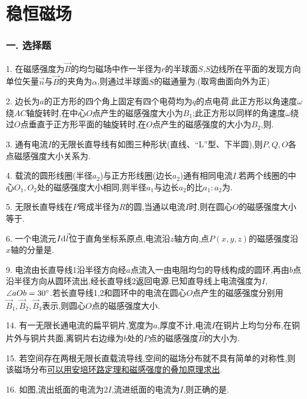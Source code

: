 \section*{稳恒磁场}

\subsubsection*{一. 选择题}

1. 在磁感强度为$\vec B$的均匀磁场中作一半径为$r$的半球面$S$,$S$边线所在平面的发现方向单位矢量$\vec n$与$\vec B$的夹角为$\alpha$,则通过半球面$S$的磁通量为.(取弯曲面向外为正)

2. 边长为$a$的正方形的四个角上固定有四个电荷均为$q$的点电荷.此正方形以角速度$\omega$绕$AC$轴旋转时,在中心$O$点产生的磁感强度大小为$B_1$;此正方形以同样的角速度$\omega$绕过$O$点垂直于正方形平面的轴旋转时,在$O$点产生的磁感强度的大小为$B_2$,则.

3. 通有电流$I$的无限长直导线有如图三种形状(直线、“L”型、下半圆),则$P,Q,O$各点磁感强度大小关系为.

4. 载流的圆形线圈(半径$a_2$)与正方形线圈(边长$a_2$)通有相同电流$I$.若两个线圈的中心$O_1,O_2$处的磁感强度大小相同,则半径$a_1$与边长$a_2$的比$a_1:a_2$为.

5. 无限长直导线在$P$弯成半径为$R$的圆,当通以电流$I$时,则在圆心$O$的磁感强度大小等于.

6. 一个电流元$I{\mathrm{d}\:\!}\vec l$位于直角坐标系原点,电流沿$z$轴方向,点$P(x,y,z)$的磁感强度沿$x$轴的分量是.

9. 电流由长直导线1沿半径方向经$a$点流入一由电阻均匀的导线构成的圆环,再由$b$点沿半径方向从圆环流出,经长直导线2返回电源.已知直导线上电流强度为$I$,$\angle aOb=30\degree$.若长直导线1,2和圆环中的电流在圆心$O$点产生的磁感强度分别用$\vec B_1,\vec B_2,\vec B_3$表示,则圆心$O$点的磁感强度大小.

14. 有一无限长通电流的扁平铜片,宽度为$a$,厚度不计,电流$I$在铜片上均匀分布,在铜片外与铜片共面,离铜片右边缘为$b$处的$P$点的磁感强度$\vec B$的大小为.

15. 若空间存在两根无限长直载流导线,空间的磁场分布就不具有简单的对称性,则该磁场分布\ul{可以用安培环路定理和磁感强度的叠加原理求出}.

16. 如图,流出纸面的电流为$2I$,流进纸面的电流为$I$,则正确的是.


